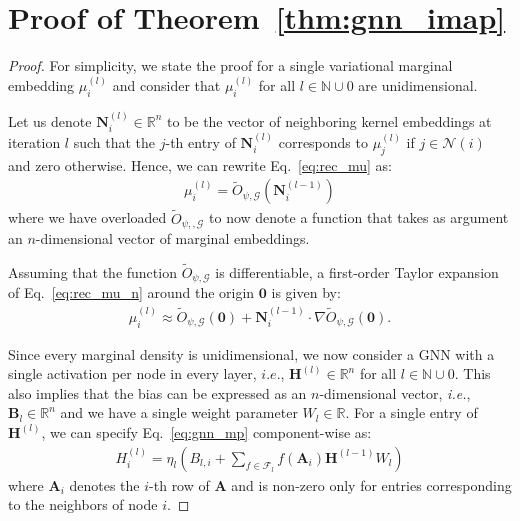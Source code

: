 \documentclass{article}
\begin{document}
\section{Proof of Theorem~\ref{thm:gnn_imap}}\label{app:enc}
\begin{proof}
For simplicity, we state the proof for a single variational marginal embedding $\mu^{(l)}_i$ and consider that $\mu^{(l)}_i$ for all $l \in \mathbb{N} \cup 0$ are unidimensional. 

Let us denote $\mathbf{N}_i^{(l)} \in \mathbb{R}^{n}$ to be the vector of neighboring kernel embeddings at iteration $l$ such that the $j$-th entry of $\mathbf{N}_i^{(l)}$ corresponds to $\mu^{(l)}_j$ if $j \in \mathcal{N}(i)$ and zero otherwise.  Hence, we can rewrite Eq.~\eqref{eq:rec_mu} as:
\begin{align}\label{eq:rec_mu_n}
\mu^{(l)}_i =\tilde{O}_{\psi, \mathcal{G}}\left(\mathbf{N}_i^{(l-1)}\right)
\end{align}
where we have overloaded $\tilde{O}_{\psi, , \mathcal{G}}$ to now denote a function that takes as argument an $n$-dimensional vector of marginal embeddings.

Assuming that the function $\tilde{O}_{\psi, \mathcal{G}}$ is differentiable, a first-order Taylor expansion of Eq.~\eqref{eq:rec_mu_n} around the origin $\mathbf{0}$ is given by:
\begin{align}\label{eq:taylor}
\mu^{(l)}_i \approx \tilde{O}_{\psi, \mathcal{G}}\left(\mathbf{0}\right)
+  \mathbf{N}_i^{(l-1)} \cdot \nabla \tilde{O}_{\psi, \mathcal{G}}\left(\mathbf{0}\right). 
\end{align}


Since every marginal density is unidimensional, we now consider a GNN with a single activation per node in every layer, $i.e.$, $\mathbf{H}^{(l)}\in \mathbb{R}^{n}$  for all $l \in \mathbb{N} \cup 0$. 
 This also implies that the bias can be expressed as an  $n$-dimensional vector, \textit{i.e.}, $\mathbf{B}_{l} \in \mathbb{R}^{n}$ and we have a single weight parameter $W_l \in \mathbb{R}$.
For a single entry of $\mathbf{H}^{(l)}$, we can specify Eq.~\eqref{eq:gnn_mp} component-wise as:
\begin{align}\label{eq:gnn_mp_comp}
H^{(l)}_i = \eta_{l}\left( B_{l,i} + \sum_{f \in \mathcal{F}_{l}}f(\mathbf{A}_i)\mathbf{H}^{(l-1)}W_l 
\right)
\end{align}
where $\mathbf{A}_i$ denotes the $i$-th row of $\mathbf{A}$ and is non-zero only for entries corresponding to the neighbors of node $i$.


\end{proof}
\end{document}
